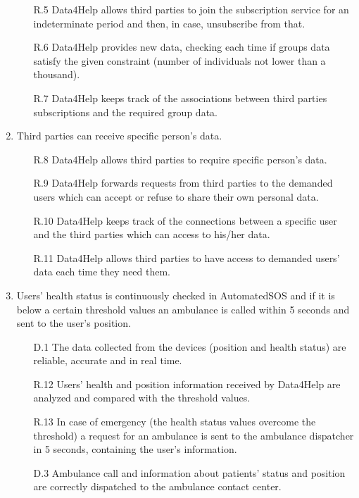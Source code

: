 \documentclass[a4paper]{article}
\begin{document}
\begin{enumerate}[label*=\bf{G.\arabic*}]
        \begin{enumerate}
            \item [R.5] Data4Help allows third parties to join the subscription service for an indeterminate period and then, in case, unsubscribe from that.
            \item [R.6] Data4Help provides new data, checking each time if groups data satisfy the given constraint (number of individuals not lower than a thousand).
            \item [R.7] Data4Help keeps track of the associations between third parties subscriptions and the required group data.
        \end{enumerate}
        
        
        \item Third parties can receive specific person's data.
                
        \begin{enumerate}
                \item[R.8] Data4Help allows third parties to require specific person's data. 
                \item [R.9] Data4Help forwards requests from third parties to the demanded users which can accept or refuse to share their own personal data.
                \item [R.10] Data4Help keeps track of the connections between a specific user and the third parties which can access to his/her data.
                \item [R.11] Data4Help allows third parties to have access to demanded users' data each time they need them.
            \end{enumerate}
                
            
        \item Users' health status is continuously checked in AutomatedSOS and if it is below a certain threshold values an ambulance is called within 5 seconds and sent to the user's position.
    
        \begin{enumerate}
            \item [D.1] The data collected from the devices (position and health status) are reliable, accurate and in real time.
            \item [R.12] Users' health and position information received by Data4Help are analyzed and compared with the threshold values.
            \item [R.13] In case of emergency (the health status values overcome the threshold) a request for an ambulance is sent to the ambulance dispatcher in 5 seconds, containing the user's information.
            \item [D.3] Ambulance call and information about patients' status and position are correctly dispatched to the ambulance contact center.
        \end{enumerate}
        

\end{enumerate}
\end{document}
